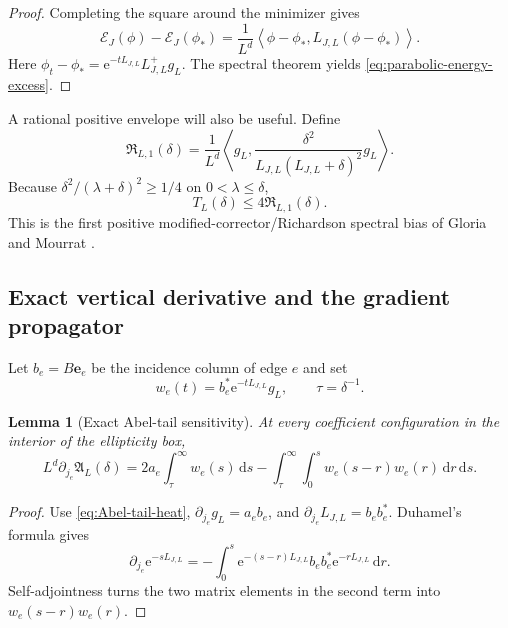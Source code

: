 \documentclass[11pt]{article}
\newtheorem{lemma}[theorem]{Lemma}
\theoremstyle{definition}
\theoremstyle{remark}
\newcommand{\e}{\mathrm e}
\newcommand{\cE}{\mathcal E}
\newcommand{\ip}[2]{\left\langle #1,#2\right\rangle}
\newcommand{\dd}{\,\mathrm d}
\begin{document}
\begin{proof}
Completing the square around the minimizer gives
\[
 \cE_J(\phi)-\cE_J(\phi_*)
 =\frac{1}{L^d}\ip{\phi-\phi_*}{L_{J,L}(\phi-\phi_*)}.
\]
Here $\phi_t-\phi_*=\e^{-tL_{J,L}}L_{J,L}^+g_L$.  The spectral theorem yields
\eqref{eq:parabolic-energy-excess}.
\end{proof}

A rational positive envelope will also be useful.  Define
\begin{equation}
 \mathfrak R_{L,1}(\delta)
 =\frac{1}{L^d}\ip{g_L}
 {\frac{\delta^2}{L_{J,L}(L_{J,L}+\delta)^2}g_L}.
 \label{eq:Richardson-one-tail}
\end{equation}
Because $\delta^2/(\lambda+\delta)^2\ge1/4$ on
$0<\lambda\le\delta$,
\begin{equation}
 \boxed{T_L(\delta)\le4\mathfrak R_{L,1}(\delta).}
 \label{eq:Richardson-dominates-sharp}
\end{equation}
This is the first positive modified-corrector/Richardson spectral bias of
Gloria and Mourrat \cite{GloriaMourrat2012}.

\subsection{Exact vertical derivative and the gradient propagator}

Let $b_e=B\mathbf e_e$ be the incidence column of edge $e$ and set
\begin{equation}
 w_e(t)=b_e^*\e^{-tL_{J,L}}g_L,
 \qquad \tau=\delta^{-1}.
 \label{eq:edge-gradient-heat-source}
\end{equation}

\begin{lemma}[Exact Abel-tail sensitivity]
\label{lem:Abel-sensitivity}
At every coefficient configuration in the interior of the ellipticity box,
\begin{equation}
 \boxed{
 L^d\partial_{j_e}\mathfrak A_L(\delta)
 =2a_e\int_\tau^\infty w_e(s)\dd s
 -\int_\tau^\infty\int_0^s
 w_e(s-r)w_e(r)\dd r\dd s.}
 \label{eq:Abel-sensitivity}
\end{equation}
\end{lemma}

\begin{proof}
Use \eqref{eq:Abel-tail-heat},
$\partial_{j_e}g_L=a_eb_e$, and
$\partial_{j_e}L_{J,L}=b_eb_e^*$.  Duhamel's formula gives
\[
 \partial_{j_e}\e^{-sL_{J,L}}
 =-\int_0^s\e^{-(s-r)L_{J,L}}b_eb_e^*
 \e^{-rL_{J,L}}\dd r.
\]
Self-adjointness turns the two matrix elements in the second term into
$w_e(s-r)w_e(r)$.
\end{proof}
\end{document}

